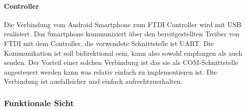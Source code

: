 		\paragraph{Controller}
		Die Verbindung vom Android Smartphone zum FTDI Controller wird mit USB realisiert. 
		Das Smartphone kommuniziert über den bereitgestellten Treiber von FTDI mit dem Controller, die verwendete Schnittstelle ist UART. Die Kommunikation ist soll bidirektional sein, kann also sowohl empfangen als auch senden. Der Vorteil einer solchen Verbindung ist das sie als COM-Schnittstelle angesteuert werden kann was relativ einfach zu implementieren ist. Die Verbindung ist ausfallsicher und einfach aufrechtzuerhalten.		
		
	\subsubsection{Funktionale Sicht}
